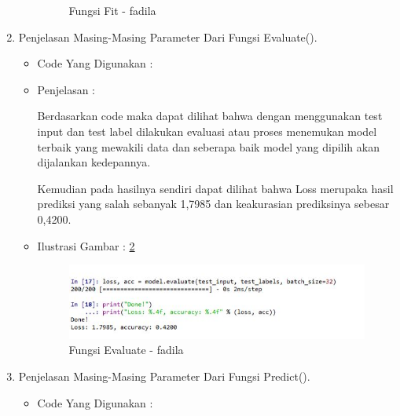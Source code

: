 \begin{enumerate}
\begin{itemize}
\begin{figure}[!hbtp]
\caption{Fungsi Fit - fadila}
\label{fungsi-fit-fadila}
\end{figure}
\par
\end{itemize}
\par
\par
\par
\par
\item Penjelasan Masing-Masing Parameter Dari Fungsi Evaluate().
\begin{itemize}
\item Code Yang Digunakan :
\par

\par
\item Penjelasan :
\par Berdasarkan code maka dapat dilihat bahwa dengan menggunakan test input dan test label dilakukan evaluasi atau proses menemukan model terbaik yang mewakili data dan seberapa baik model yang dipilih akan dijalankan kedepannya. 
\par Kemudian pada hasilnya sendiri dapat dilihat bahwa Loss merupaka hasil prediksi yang salah sebanyak 1,7985 dan keakurasian prediksinya sebesar 0,4200.
\par
\par
\item Ilustrasi Gambar : \ref{fungsi-evaluate-fadila}
\par
\begin{figure}[!hbtp]
\centering
\includegraphics[scale=0.2]{figures/fungsi-evaluate-fadila.jpg}
\caption{Fungsi Evaluate - fadila}
\label{fungsi-evaluate-fadila}
\end{figure}
\par
\par
\par
\par
\par
\end{itemize}
\item Penjelasan Masing-Masing Parameter Dari Fungsi Predict().
\begin{itemize}
\item Code Yang Digunakan :

\end{itemize}
\end{enumerate}
